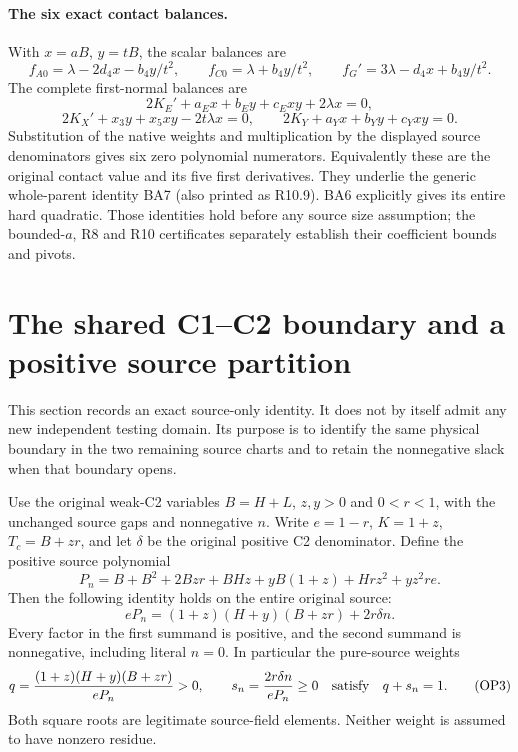 \paragraph{The six exact contact balances.}
With $x=aB$, $y=tB$, the scalar balances are
\[
 f_{A0}=\lambda-2d_4x-b_4y/t^2,\qquad
 f_{C0}=\lambda+b_4y/t^2,\qquad
 f_G'=3\lambda-d_4x+b_4y/t^2.\tag{RC1}
\]
The complete first-normal balances are
\[
 2K_E'+a_Ex+b_Ey+c_Exy+2\lambda x=0,
\]
\[
 2K_X'+x_3y+x_5xy-2t\lambda x=0,\qquad
 2K_Y+a_Yx+b_Yy+c_Yxy=0.\tag{RC6}
\]
Substitution of the native weights and multiplication by the displayed
source denominators gives six zero polynomial numerators. Equivalently
these are the original contact value and its five first derivatives.
They underlie the generic whole-parent identity BA7 (also printed as
R10.9). BA6 explicitly gives its entire hard quadratic. Those identities
hold before any source size assumption; the bounded-$a$, R8 and R10
certificates separately establish their coefficient bounds and pivots.


\section{\texorpdfstring{The shared C1--C2 boundary and a positive source partition}{The shared C1--C2 boundary and a positive source partition}}
\label{component:pc024f5300388}

\label{pc024f5300388:sec:r13-source-overlap}

This section records an exact source-only identity. It does not by itself
admit any new independent testing domain. Its purpose is to identify the
same physical boundary in the two remaining source charts and to retain
the nonnegative slack when that boundary opens.

Use the original weak-C2 variables $B=H+L$, $z,y>0$ and $0<r<1$,
with the unchanged source gaps and nonnegative $n$. Write $e=1-r$,
$K=1+z$, $T_c=B+zr$, and let $\delta$ be the original positive
C2 denominator. Define the positive source polynomial
\[
 P_n=B+B^2+2Bzr+BHz+yB(1+z)+Hrz^2+yz^2re.
 \tag{OP1}
\]
Then the following identity holds on the entire original source:
\[
 \boxed{\quad eP_n=(1+z)(H+y)(B+zr)+2r\delta n.\quad}
 \tag{OP2}
\]
Every factor in the first summand is positive, and the second summand
is nonnegative, including literal $n=0$. In particular the pure-source
weights
\[
 q={ (1+z)(H+y)(B+zr)\over eP_n}>0,
 \qquad s_n={2r\delta n\over eP_n}\ge0
 \quad\hbox{satisfy}\quad q+s_n=1.                   \tag{OP3}
\]
Both square roots are legitimate source-field elements. Neither weight
is assumed to have nonzero residue.

